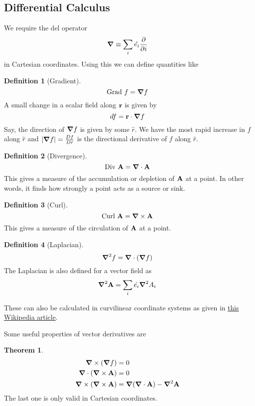 \documentclass[10pt, a4paper]{extarticle}
\theoremstyle{definition}
\newtheorem{thm}{Theorem}
\newtheorem{defn}{Definition}
\begin{document}
\subsection{Differential Calculus}
We require the del operator
\[\grad\equiv \sum_i\hat{e_i}\pdv{}{i}\] in Cartesian coordinates. Using this we can define quantities like
\begin{framed}
	\begin{defn}[Gradient]
		\[\text{Grad }f=\grad f\]
		A small change in a scalar field along $\vb{r}$ is given by
		\[df=\vb{r}\cdot\grad f\]
		Say, the direction of $\grad f$ is given by some $\hat{r}$. We have the most rapid increase in $f$ along $\hat{r}$ and $|\grad f|=\frac{Df}{D\hat{r}}$ is the directional derivative of $f$ along $\hat{r}$.
	\end{defn}

	\begin{defn}[Divergence]
		\[\text{Div }\vb{A}=\grad\cdot\vb{A}\]
		This gives a measure of the accumulation or depletion of $\vb{A}$ at a point. In other words, it finds how strongly a point acts as a source or sink.
	\end{defn}

	\begin{defn}[Curl]
		\[\text{Curl }\vb{A}=\grad\times\vb{A}\]
		This gives a measure of the circulation of $\vb{A}$ at a point.
	\end{defn}

	\begin{defn}[Laplacian]
		\[\grad^2 f=\grad\cdot(\grad f)\]
		The Laplacian is also defined for a vector field as
		\[\grad^2\vb{A}=\sum_i \hat{e_i}\grad^2A_i\]
	\end{defn}
\end{framed}
These can also be calculated in curvilinear coordinate systems as given in \href{https://en.wikipedia.org/wiki/Del_in_cylindrical_and_spherical_coordinates}{this Wikipedia article}. 

Some useful properties of vector derivatives are
\begin{framed}
	\begin{thm}
		\begin{align*}
			\grad\times(\grad f)&=0\\
			\grad\cdot(\grad\times\vb{A})&=0\\
		\grad\times(\grad\times\vb{A})&=\grad(\grad\cdot\vb{A})-\grad^2\vb{A}
		\end{align*}
		The last one is only valid in Cartesian coordinates.
	\end{thm}
\end{framed}
\end{document}
